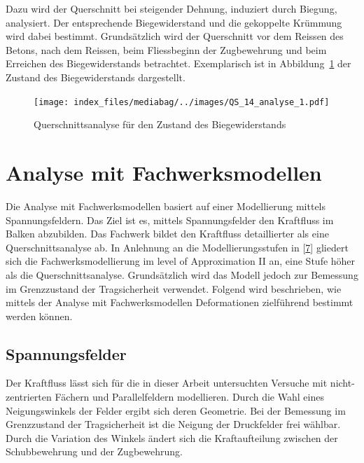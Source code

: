 \documentclass[
  12pt,
  letterpaper,
  egregdoesnotlikesansseriftitles]{scrreprt}
\begin{document}
Dazu wird der Querschnitt bei steigender Dehnung, induziert durch
Biegung, analysiert. Der entsprechende Biegewiderstand und die
gekoppelte Krümmung wird dabei bestimmt. Grundsätzlich wird der
Querschnitt vor dem Reissen des Betons, nach dem Reissen, beim
Fliessbeginn der Zugbewehrung und beim Erreichen des Biegewiderstands
betrachtet. Exemplarisch ist in Abbildung~\ref{fig-exemplar_qs_analyse}
der Zustand des Biegewiderstands dargestellt.

\begin{figure}[H]

{\centering \texttt{[image: index\_files/mediabag/../images/QS\_14\_analyse\_1.pdf]}

}

\caption{\label{fig-exemplar_qs_analyse}Querschnittsanalyse für den
Zustand des Biegewiderstands}

\end{figure}

\hypertarget{sec-fachwerk}{%
\section{Analyse mit Fachwerksmodellen}\label{sec-fachwerk}}

Die Analyse mit Fachwerksmodellen basiert auf einer Modellierung mittels
Spannungsfeldern. Das Ziel ist es, mittels Spannungsfelder den
Kraftfluss im Balken abzubilden. Das Fachwerk bildet den Kraftfluss
detaillierter als eine Querschnittsanalyse ab. In Anlehnung an die
Modellierungsstufen in {[}\protect\hyperlink{ref-Thoma2020}{7}{]}
gliedert sich die Fachwerksmodellierung im level of Approximation II an,
eine Stufe höher als die Querschnittsanalyse. Grundsätzlich wird das
Modell jedoch zur Bemessung im Grenzzustand der Tragsicherheit
verwendet. Folgend wird beschrieben, wie mittels der Analyse mit
Fachwerksmodellen Deformationen zielführend bestimmt werden können.

\hypertarget{spannungsfelder}{%
\subsection{Spannungsfelder}\label{spannungsfelder}}

Der Kraftfluss lässt sich für die in dieser Arbeit untersuchten Versuche
mit nicht-zentrierten Fächern und Parallelfeldern modellieren. Durch die
Wahl eines Neigungswinkels der Felder ergibt sich deren Geometrie. Bei
der Bemessung im Grenzzustand der Tragsicherheit ist die Neigung der
Druckfelder frei wählbar. Durch die Variation des Winkels ändert sich
die Kraftaufteilung zwischen der Schubbewehrung und der Zugbewehrung.
\end{document}
